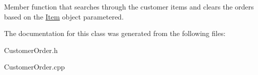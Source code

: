Member function that searches through the customer items and clears the orders based on the \mbox{\hyperlink{classItem}{Item}} object parametered. 

The documentation for this class was generated from the following files\+:\begin{DoxyCompactItemize}
\item 
Customer\+Order.\+h\item 
Customer\+Order.\+cpp\end{DoxyCompactItemize}
